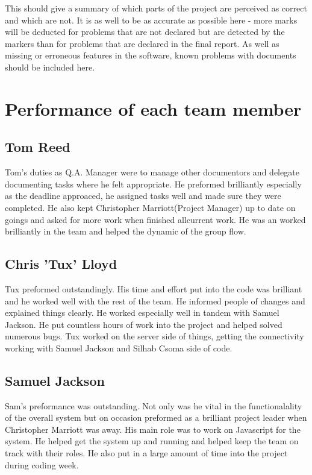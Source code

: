 \documentclass{project}
\begin{document}
This should give a summary of which parts of the project are perceived as correct and
which are not. It is as well to be as accurate as possible here - more marks will be deducted for problems that are
not declared but are detected by the markers than for problems that are declared in the final report. As well as
missing or erroneous features in the software, known problems with documents should be included here.

\section{Performance of each team member}
\subsection{Tom Reed}
Tom's duties as Q.A. Manager were to manage other documentors and delegate documenting tasks where he felt appropriate. He preformed brilliantly especially as the deadline approaced, he assigned tasks well and made sure they were completed. He also kept Christopher Marriott(Project Manager) up to date on goings and asked for more work when finished allcurrent work. He was an worked brilliantly in the team and helped the dynamic of the group flow.  

\subsection{Chris 'Tux' Lloyd}
Tux preformed outstandingly. His time and effort put into the code was brilliant and he worked well with the rest of the team. He informed people of changes and explained things clearly. He worked especially well in tandem with Samuel Jackson. He put countless hours of work into the project and helped solved numerous bugs. Tux worked on the server side of things, getting the connectivity working with Samuel Jackson and Silhab Csoma side of code.

\subsection{Samuel Jackson}
Sam's preformance was outstanding. Not only was he vital in the functionalality of the overall system but on occasion preformed as a brilliant project leader when Christopher Marriott was away. His main role was to work on Javascript for the system. He helped get the system up and running and helped keep the team on track with their roles. He also put in a large amount of time into the project during coding week.
\end{document}
